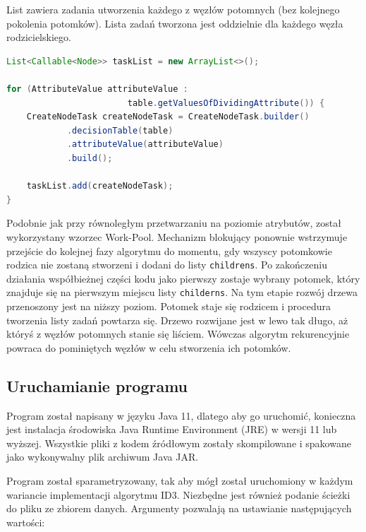 \documentclass[12pt]{article}
\begin{document}
List zawiera zadania utworzenia każdego z węzłów potomnych (bez kolejnego pokolenia potomków). Lista zadań tworzona jest oddzielnie
dla każdego węzła rodzicielskiego.

\begin{lstlisting}[language=java, caption=Lista zadań równoległego tworzenia węzłów,frame=single,label={lst:create-node-parallel}]
List<Callable<Node>> taskList = new ArrayList<>();

for (AttributeValue attributeValue :
                        table.getValuesOfDividingAttribute()) {
    CreateNodeTask createNodeTask = CreateNodeTask.builder()
            .decisionTable(table)
            .attributeValue(attributeValue)
            .build();

    taskList.add(createNodeTask);
}
\end{lstlisting}

Podobnie jak przy równoległym przetwarzaniu na poziomie atrybutów, został wykorzystany wzorzec Work-Pool.
Mechanizm blokujący ponownie wstrzymuje przejście do kolejnej fazy algorytmu do momentu, gdy wszyscy potomkowie rodzica nie zostaną stworzeni
i dodani do listy \verb|childrens|. Po zakończeniu działania współbieżnej części kodu jako pierwszy zostaje wybrany potomek, który znajduje się
na pierwszym miejscu listy \verb|childerns|. Na tym etapie rozwój drzewa przenoszony jest na niższy poziom. Potomek staje się rodzicem
i procedura tworzenia listy zadań powtarza się. Drzewo rozwijane jest w lewo tak długo, aż któryś z węzłów potomnych stanie się liściem.
Wówczas algorytm rekurencyjnie powraca do pominiętych węzłów w celu stworzenia ich potomków.

\subsection{Uruchamianie programu}

Program został napisany w języku Java 11, dlatego aby go uruchomić, konieczna jest instalacja środowiska Java Runtime Environment (JRE)
w wersji 11 lub wyższej. Wszystkie pliki z kodem źródłowym zostały skompilowane i spakowane jako wykonywalny plik archiwum Java JAR.

Program został sparametryzowany, tak aby mógł został uruchomiony w każdym wariancie implementacji algorytmu ID3. Niezbędne jest również
podanie ścieżki do pliku ze zbiorem danych. Argumenty pozwalają na ustawianie następujących wartości:
\end{document}
